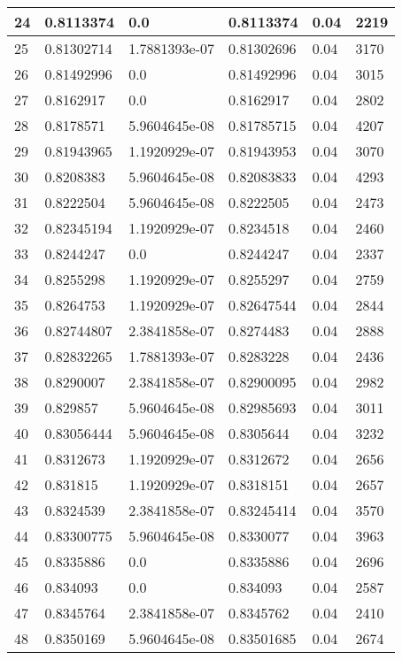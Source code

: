 \begin{longtable}{|l|l|l|l|l|l|}
24 & 0.8113374 & 0.0 & 0.8113374 & 0.04 & 2219 \\ \hline 
25 & 0.81302714 & 1.7881393e-07 & 0.81302696 & 0.04 & 3170 \\ \hline 
26 & 0.81492996 & 0.0 & 0.81492996 & 0.04 & 3015 \\ \hline 
27 & 0.8162917 & 0.0 & 0.8162917 & 0.04 & 2802 \\ \hline 
28 & 0.8178571 & 5.9604645e-08 & 0.81785715 & 0.04 & 4207 \\ \hline 
29 & 0.81943965 & 1.1920929e-07 & 0.81943953 & 0.04 & 3070 \\ \hline 
30 & 0.8208383 & 5.9604645e-08 & 0.82083833 & 0.04 & 4293 \\ \hline 
31 & 0.8222504 & 5.9604645e-08 & 0.8222505 & 0.04 & 2473 \\ \hline 
32 & 0.82345194 & 1.1920929e-07 & 0.8234518 & 0.04 & 2460 \\ \hline 
33 & 0.8244247 & 0.0 & 0.8244247 & 0.04 & 2337 \\ \hline 
34 & 0.8255298 & 1.1920929e-07 & 0.8255297 & 0.04 & 2759 \\ \hline 
35 & 0.8264753 & 1.1920929e-07 & 0.82647544 & 0.04 & 2844 \\ \hline 
36 & 0.82744807 & 2.3841858e-07 & 0.8274483 & 0.04 & 2888 \\ \hline 
37 & 0.82832265 & 1.7881393e-07 & 0.8283228 & 0.04 & 2436 \\ \hline 
38 & 0.8290007 & 2.3841858e-07 & 0.82900095 & 0.04 & 2982 \\ \hline 
39 & 0.829857 & 5.9604645e-08 & 0.82985693 & 0.04 & 3011 \\ \hline 
40 & 0.83056444 & 5.9604645e-08 & 0.8305644 & 0.04 & 3232 \\ \hline 
41 & 0.8312673 & 1.1920929e-07 & 0.8312672 & 0.04 & 2656 \\ \hline 
42 & 0.831815 & 1.1920929e-07 & 0.8318151 & 0.04 & 2657 \\ \hline 
43 & 0.8324539 & 2.3841858e-07 & 0.83245414 & 0.04 & 3570 \\ \hline 
44 & 0.83300775 & 5.9604645e-08 & 0.8330077 & 0.04 & 3963 \\ \hline 
45 & 0.8335886 & 0.0 & 0.8335886 & 0.04 & 2696 \\ \hline 
46 & 0.834093 & 0.0 & 0.834093 & 0.04 & 2587 \\ \hline 
47 & 0.8345764 & 2.3841858e-07 & 0.8345762 & 0.04 & 2410 \\ \hline 
48 & 0.8350169 & 5.9604645e-08 & 0.83501685 & 0.04 & 2674 \\ \hline 

\end{longtable}
